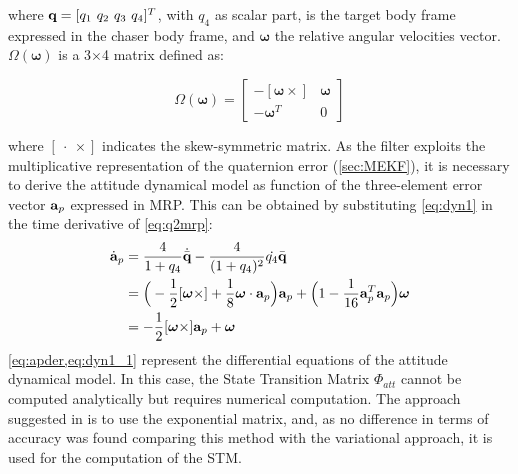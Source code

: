 where $\vect{q} = [q_1\ q_2\ q_3\ q_4]^T$, with $q_4$ as scalar part, is the target body frame expressed in the chaser body frame, and $\boldsymbol{\omega}$ the relative angular velocities vector. $\Omega(\boldsymbol{\omega})$ is a 3$\times$4 matrix defined as:

\begin{equation}
    \label{eq:dyn2}
    \Omega(\boldsymbol{\omega}) = \begin{bmatrix}
        -[\boldsymbol{\omega}\times] & \boldsymbol{\omega}\\
        -\boldsymbol{\omega}^T & 0
    \end{bmatrix}
\end{equation}

where $[\boldsymbol{\ \cdot \ }\times]$ indicates the skew-symmetric matrix. As the filter exploits the multiplicative representation of the quaternion error (\cref{sec:MEKF}), it is necessary to derive the attitude dynamical model as function of the three-element error vector $\mathrm{\textbf{a}}_p$ expressed in MRP. 
This can be obtained by substituting  \cref{eq:dyn1} in the time derivative of \cref{eq:q2mrp}:
\begin{equation}
    \label{eq:apder}
    \begin{split}
        \dot{\mathrm{\textbf{a}}}_p & = \dfrac{4}{1+q_4}\dot{\bar{\mathrm{\textbf{q}}}} - \dfrac{4}{(1+q_4)^2}\dot{q_4}\bar{\mathrm{\textbf{q}}}\\
        & = \Big(-\dfrac{1}{2}[\boldsymbol{\omega}\times] + \dfrac{1}{8}\boldsymbol{\omega}\cdot\mathrm{\textbf{a}}_p\Big)\mathrm{\textbf{a}}_p+\Big(1-\dfrac{1}{16}\mathrm{\textbf{a}}_p^T\mathrm{\textbf{a}}_p\Big)\boldsymbol{\omega}\\
        & = -\dfrac{1}{2}[\boldsymbol{\omega}\times]\mathrm{\textbf{a}}_p+\boldsymbol{\omega}\\
    \end{split}
\end{equation}
\cref{eq:apder,eq:dyn1_1} represent the differential equations of the attitude dynamical model. 
In this case, the State Transition Matrix $\Phi_{att}$ cannot be computed analytically but requires numerical computation. The approach suggested in \cite{tweddle2015relative} is to use the exponential matrix, and, as no difference in terms of accuracy was found comparing this method with the variational approach, it is used for the computation of the STM. \\

